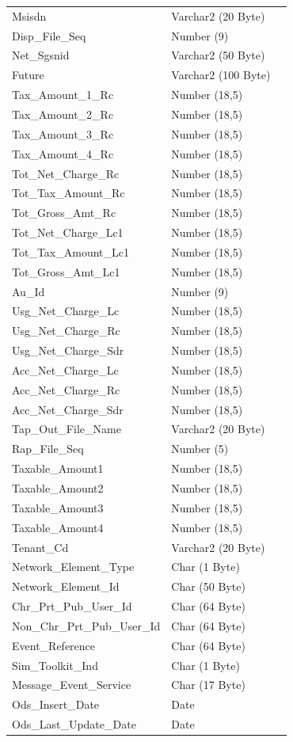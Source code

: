 \documentclass[12pt,twoside]{article}
\begin{document}
\begin{longtable}{l|l|l}
Msisdn & Varchar2 (20 Byte) & \\
Disp\_File\_Seq & Number (9) & \\
Net\_Sgsnid & Varchar2 (50 Byte) & \\
Future & Varchar2 (100 Byte) & \\
Tax\_Amount\_1\_Rc & Number (18,5) & \\
Tax\_Amount\_2\_Rc & Number (18,5) & \\
Tax\_Amount\_3\_Rc & Number (18,5) & \\
Tax\_Amount\_4\_Rc & Number (18,5) & \\
Tot\_Net\_Charge\_Rc & Number (18,5) & \\
Tot\_Tax\_Amount\_Rc & Number (18,5) & \\
Tot\_Gross\_Amt\_Rc & Number (18,5) & \\
Tot\_Net\_Charge\_Lc1 & Number (18,5) & \\
Tot\_Tax\_Amount\_Lc1 & Number (18,5) & \\
Tot\_Gross\_Amt\_Lc1 & Number (18,5) & \\
Au\_Id & Number (9) & \\
Usg\_Net\_Charge\_Lc & Number (18,5) & \\
Usg\_Net\_Charge\_Rc & Number (18,5) & \\
Usg\_Net\_Charge\_Sdr & Number (18,5) & \\
Acc\_Net\_Charge\_Lc & Number (18,5) & \\
Acc\_Net\_Charge\_Rc & Number (18,5) & \\
Acc\_Net\_Charge\_Sdr & Number (18,5) & \\
Tap\_Out\_File\_Name & Varchar2 (20 Byte) & \\
Rap\_File\_Seq & Number (5) & \\
Taxable\_Amount1 & Number (18,5) & \\
Taxable\_Amount2 & Number (18,5) & \\
Taxable\_Amount3 & Number (18,5) & \\
Taxable\_Amount4 & Number (18,5) & \\
Tenant\_Cd & Varchar2 (20 Byte) & \\
Network\_Element\_Type & Char (1 Byte) & \\
Network\_Element\_Id & Char (50 Byte) & \\
Chr\_Prt\_Pub\_User\_Id & Char (64 Byte) & \\
Non\_Chr\_Prt\_Pub\_User\_Id & Char (64 Byte) & \\
Event\_Reference & Char (64 Byte) & \\
Sim\_Toolkit\_Ind & Char (1 Byte) & \\
Message\_Event\_Service & Char (17 Byte) & \\
Ods\_Insert\_Date & Date & \\
Ods\_Last\_Update\_Date & Date & \\
\hline
\end{longtable}
\normalsize
\end{document}
